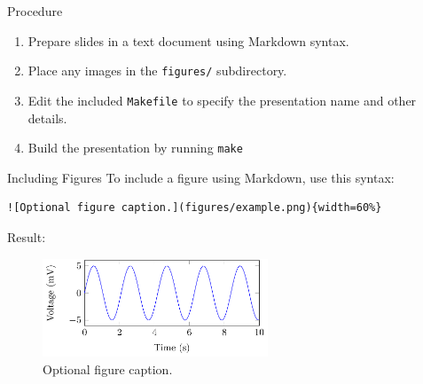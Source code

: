 \documentclass[10pt,ignorenonframetext,]{beamer}
\providecommand{\tightlist}{%
  \setlength{\itemsep}{0pt}\setlength{\parskip}{0pt}}
\begin{document}
\begin{frame}[fragile]{Procedure}
\protect\hypertarget{procedure}{}
\begin{enumerate}[<+->]
\tightlist
\item
  Prepare slides in a text document using Markdown syntax.
\item
  Place any images in the \texttt{figures/} subdirectory.
\item
  Edit the included \texttt{Makefile} to specify the presentation name
  and other details.
\item
  Build the presentation by running \texttt{make}
\end{enumerate}
\end{frame}

\begin{frame}[fragile]{Including Figures}
\protect\hypertarget{including-figures}{}
To include a figure using Markdown, use this syntax:

\begin{verbatim}
![Optional figure caption.](figures/example.png){width=60%}
\end{verbatim}

Result:

\begin{figure}
\centering
\includegraphics[width=0.6\textwidth,height=\textheight]{figures/example.png}
\caption{Optional figure caption.}
\end{figure}
\end{frame}
\end{document}

